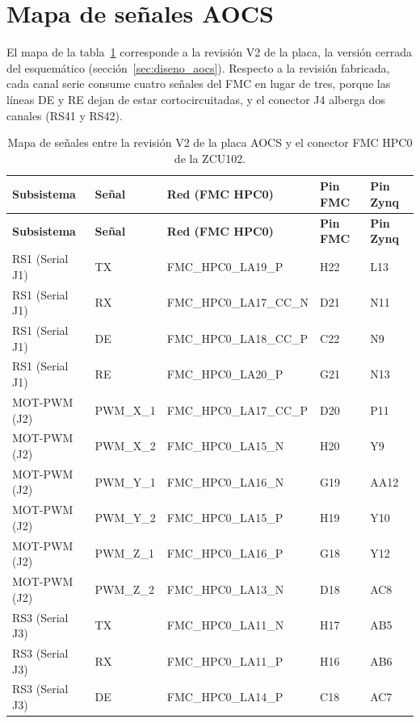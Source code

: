 \section{Mapa de señales AOCS} \label{anxC:mapa_aocs}

El mapa de la tabla~\ref{tab:mapa_aocs} corresponde a la revisión V2 de la placa, la versión
cerrada del esquemático (sección~\ref{sec:diseno_aocs}). Respecto a la revisión fabricada, cada canal serie consume
cuatro señales del FMC en lugar de tres, porque las líneas DE y RE dejan de estar
cortocircuitadas, y el conector J4 alberga dos canales (RS41 y RS42).

{\small
\begin{longtable}{lllll}
    \caption{Mapa de señales entre la revisión V2 de la placa AOCS y el conector FMC HPC0 de la
    ZCU102.} \label{tab:mapa_aocs} \\
    \hline
    \textbf{Subsistema} & \textbf{Señal} & \textbf{Red (FMC HPC0)} & \textbf{Pin FMC} & \textbf{Pin Zynq} \\
    \hline
    \endfirsthead
    \hline
    \textbf{Subsistema} & \textbf{Señal} & \textbf{Red (FMC HPC0)} & \textbf{Pin FMC} & \textbf{Pin Zynq} \\
    \hline
    \endhead
    \hline
    \endfoot
    RS1 (Serial J1) & TX & FMC\_HPC0\_LA19\_P & H22 & L13 \\
    RS1 (Serial J1) & RX & FMC\_HPC0\_LA17\_CC\_N & D21 & N11 \\
    RS1 (Serial J1) & DE & FMC\_HPC0\_LA18\_CC\_P & C22 & N9 \\
    RS1 (Serial J1) & RE & FMC\_HPC0\_LA20\_P & G21 & N13 \\
    MOT-PWM (J2) & PWM\_X\_1 & FMC\_HPC0\_LA17\_CC\_P & D20 & P11 \\
    MOT-PWM (J2) & PWM\_X\_2 & FMC\_HPC0\_LA15\_N & H20 & Y9 \\
    MOT-PWM (J2) & PWM\_Y\_1 & FMC\_HPC0\_LA16\_N & G19 & AA12 \\
    MOT-PWM (J2) & PWM\_Y\_2 & FMC\_HPC0\_LA15\_P & H19 & Y10 \\
    MOT-PWM (J2) & PWM\_Z\_1 & FMC\_HPC0\_LA16\_P & G18 & Y12 \\
    MOT-PWM (J2) & PWM\_Z\_2 & FMC\_HPC0\_LA13\_N & D18 & AC8 \\
    RS3 (Serial J3) & TX & FMC\_HPC0\_LA11\_N & H17 & AB5 \\
    RS3 (Serial J3) & RX & FMC\_HPC0\_LA11\_P & H16 & AB6 \\
    RS3 (Serial J3) & DE & FMC\_HPC0\_LA14\_P & C18 & AC7 \\

\end{longtable}}
